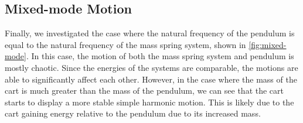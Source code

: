 \documentclass[12pt]{article}
\begin{document}
\subsection{Mixed-mode Motion}

Finally, we investigated the case where the natural frequency of the pendulum is equal to the natural frequency of the mass spring system, shown in \autoref{fig:mixed-mode}. In this case, the motion of both the mass spring system and pendulum is mostly chaotic. Since the energies of the systems are comparable, the motions are able to significantly affect each other. However, in the case where the mass of the cart is much greater than the mass of the pendulum, we can see that the cart starts to display a more stable simple harmonic motion. This is likely due to the cart gaining energy relative to the pendulum due to its increased mass.
\end{document}
